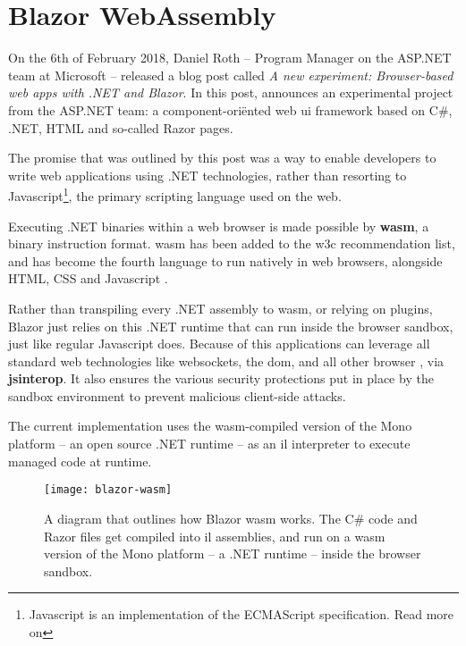 \section{Blazor WebAssembly}

On the 6th of February 2018, Daniel Roth -- Program Manager on the ASP.NET team
at Microsoft -- released a blog post called \textit{A new experiment:
Browser-based web apps with .NET and Blazor}. In this post, \textcite{Roth_2018}
announces an experimental project from the ASP.NET team: a component-ori\"ented
web \gls{ui} framework based on C\#, .NET, HTML and so-called Razor pages. 

The promise that was outlined by this post was a way to enable developers to
write web applications using .NET technologies, rather than resorting to
Javascript\footnote{Javascript is an implementation of the ECMAScript
specification. Read more on }, the
primary scripting language used on the web.

Executing .NET binaries within a web browser is made possible by
\textbf{\gls{wasm}}, a binary instruction format.
\Gls{wasm} has been added to the \gls{w3c} recommendation list, and has become
the fourth language to run natively in web browsers, alongside HTML, CSS and
Javascript \autocite{Couriol_2019}. 

Rather than \gls{transpiling} every .NET assembly to \gls{wasm}, or relying on
plugins, Blazor just relies on this .NET runtime that can run inside the browser
sandbox, just like regular Javascript does. Because of this applications can
leverage all standard web technologies like websockets, the \gls{dom}, and all
other browser , via \textbf{\gls{jsinterop}}. It also ensures the
various security protections put in place by the sandbox environment to prevent
malicious client-side attacks.

The current implementation uses the \gls{wasm}-compiled version of the
Mono platform -- an open source .NET
runtime -- as an \gls{il} interpreter to execute managed code at runtime.


\begin{figure}
  \centering
  \texttt{[image: blazor-wasm]}
  \caption[Blazor WebAssembly]{A diagram that outlines how Blazor \gls{wasm}
  works. The C\# code and Razor files get compiled into \gls{il} assemblies, and
  run on a \gls{wasm} version of the Mono platform -- a .NET runtime -- inside
  the browser sandbox.}
  \label{fig:blazor-wasm}
\end{figure}


